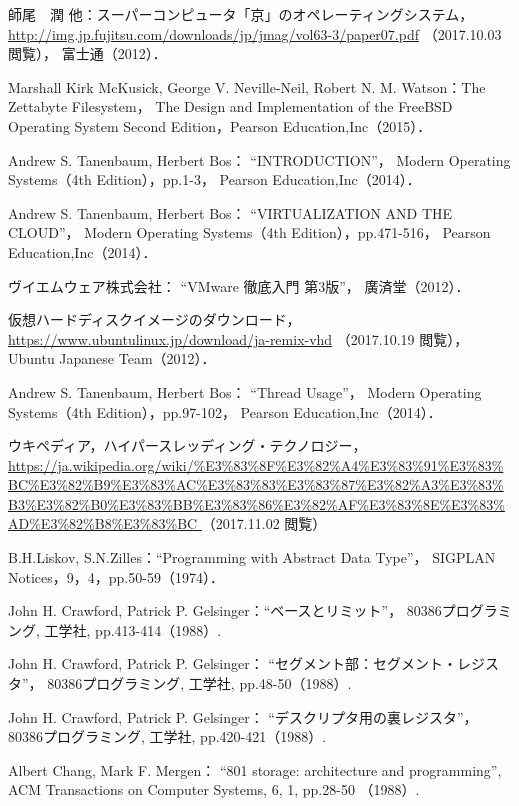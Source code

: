 \begin{thebibliography}{9}
師尾　潤 他：スーパーコンピュータ「京」のオペレーティングシステム，
\url{http://img.jp.fujitsu.com/downloads/jp/jmag/vol63-3/paper07.pdf}
（2017.10.03 閲覧），
富士通（2012）．

Marshall Kirk McKusick,
George V. Neville-Neil,
Robert N. M. Watson：The Zettabyte Filesystem，
The Design and Implementation of the FreeBSD Operating System
Second Edition，Pearson Education,Inc（2015）．


Andrew S. Tanenbaum, Herbert Bos：
``INTRODUCTION''，
Modern Operating Systems（4th Edition），pp.1-3，
Pearson Education,Inc（2014）．

Andrew S. Tanenbaum, Herbert Bos：
``VIRTUALIZATION AND THE CLOUD''，
Modern Operating Systems（4th Edition），pp.471-516，
Pearson Education,Inc（2014）．

ヴイエムウェア株式会社：
``VMware 徹底入門 第3版''，
廣済堂（2012）．

仮想ハードディスクイメージのダウンロード，
\url{https://www.ubuntulinux.jp/download/ja-remix-vhd}
（2017.10.19 閲覧），
Ubuntu Japanese Team（2012）．

Andrew S. Tanenbaum, Herbert Bos：
``Thread Usage''，
Modern Operating Systems（4th Edition），pp.97-102，
Pearson Education,Inc（2014）．

ウキペディア，ハイパースレッディング・テクノロジー，
\url{
https://ja.wikipedia.org/wiki/%
}（2017.11.02 閲覧）

B.H.Liskov, S.N.Zilles：``Programming with Abstract Data Type''，
SIGPLAN Notices，9，4，pp.50-59（1974）．

John H. Crawford, Patrick P. Gelsinger：``ベースとリミット''，
80386プログラミング, 工学社, pp.413-414（1988）.

John H. Crawford, Patrick P. Gelsinger：
``セグメント部：セグメント・レジスタ''，
80386プログラミング, 工学社, pp.48-50（1988）.

John H. Crawford, Patrick P. Gelsinger：
``デスクリプタ用の裏レジスタ''，
80386プログラミング, 工学社, pp.420-421（1988）.

Albert Chang, Mark F. Mergen：
``801 storage: architecture and programming'',
ACM Transactions on Computer Systems, 6, 1,
pp.28-50 （1988）.
\end{thebibliography}

